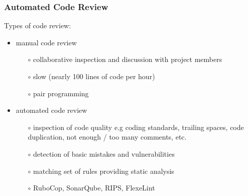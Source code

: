 \documentclass[10pt,xcolor=pdflatex]{beamer}
\begin{document}
\begin{frame}\frametitle{Automated Code Review}
	Types of code review:
	\begin{itemize}
		\item manual code review
			\begin{itemize}
				\item[$\circ$] collaborative inspection and discussion with project members\\[0.25em]
				\item[$\circ$] slow (nearly 100 lines of code per hour)\\[0.25em]
				\item[$\circ$] pair programming\\[0.5em]
			\end{itemize}
		\item automated code review
			\begin{itemize}
				\item[$\circ$] inspection of code quality e.g coding standards, trailing spaces, code duplication, not enough / too many comments, etc.\\[0.25em]
				\item[$\circ$] detection of basic mistakes and vulnerabilities\\[0.25em]
				\item[$\circ$] matching set of rules providing static analysis\\[0.25em]
				\item[$\circ$] RuboCop, SonarQube, RIPS, FlexeLint
			\end{itemize}
	\end{itemize}
\end{frame}

\end{document}
